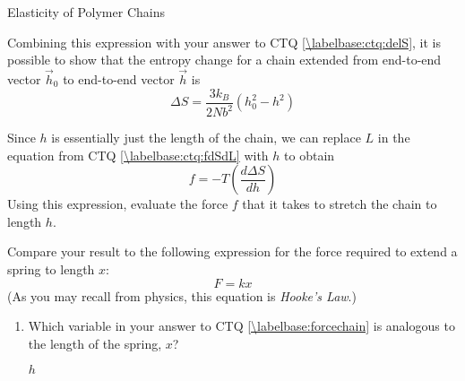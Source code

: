 \begin{activity}{Elasticity of Polymer Chains}
\begin{infobox}
	Combining this expression with your answer to CTQ \ref{\labelbase:ctq:delS}, it is possible to show that the entropy change for a chain extended from end-to-end vector $\vec h_0$ to end-to-end vector $\vec h$ is
	\begin{equation*}
		\Delta S = \frac{3 k_B}{2 Nb^2}\left( h_0^2 - h^2 \right)
	\end{equation*}
	
\end{infobox}

\begin{ctqs}
	
	\question Since $h$ is essentially just the length of the chain, we can replace $L$ in the equation from CTQ \ref{\labelbase:ctq:fdSdL} with $h$ to obtain
		\begin{equation*}
			f = -T\left(\frac{d\Delta S}{dh}\right)
		\end{equation*}
		Using this expression, evaluate the force $f$ that it takes to stretch the chain to length $h$.
		\label{\labelbase:forcechain}
		
		\begin{solution}[2in]\end{solution}
		
	\question Compare your result to the following expression for the force required to extend a spring to length $x$:
		\begin{equation*}
			F = kx
		\end{equation*}
		(As you may recall from physics, this equation is \emph{Hooke's Law}.)
		
		\begin{enumerate}
			\item Which variable in your answer to CTQ \ref{\labelbase:forcechain} is analogous to the length of the spring, $x$?
		
				\begin{solution}[0.25in]
					$h$
				\end{solution}
			

\end{enumerate}
\end{ctqs}
\end{activity}
